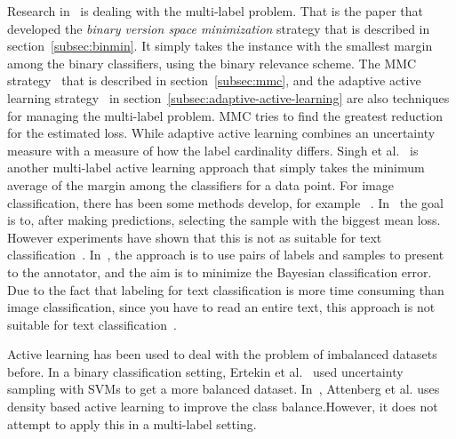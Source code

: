Research in~\cite{brinker2006active} is dealing with the multi-label problem.
That is the paper that developed the \textit{binary version space minimization} strategy that is described in section~\ref{subsec:binmin}.
It simply takes the instance with the smallest margin among the binary classifiers, using the binary relevance scheme.
The MMC strategy~\cite{yang2009effective} that is described in section~\ref{subsec:mmc}, and the adaptive active learning strategy~\cite{li2013active} in section~\ref{subsec:adaptive-active-learning} are also techniques for managing the multi-label problem.
MMC tries to find the greatest reduction for the estimated loss.
While adaptive active learning combines an uncertainty measure with a measure of how the label cardinality differs.
Singh et al\@.~\cite{singh2009active} is another multi-label active learning approach that simply takes the minimum average of the margin among the classifiers for a data point.
For image classification, there has been some methods develop, for example ~\cite{li2004multilabel, qi2008two}.
In~\cite{li2004multilabel} the goal is to, after making predictions, selecting the sample with the biggest mean loss.
However experiments have shown that this is not as suitable for text classification~\cite{yang2009effective}.
In~\cite{qi2008two}, the approach is to use pairs of labels and samples to present to the annotator, and the aim is to minimize the Bayesian classification error.
Due to the fact that labeling for text classification is more time consuming than image classification, since you have to read an entire text, this approach is not suitable for text classification~\cite{yang2009effective}.

Active learning has been used to deal with the problem of imbalanced datasets before.
In a binary classification setting, Ertekin et al\@.~\cite{ertekin2007learning} used uncertainty sampling with SVMs to get a more balanced dataset.
In~\cite{attenberg2013class}, Attenberg et al\@. uses density based active learning to improve the class balance.However, it does not attempt to apply this in a multi-label setting.
